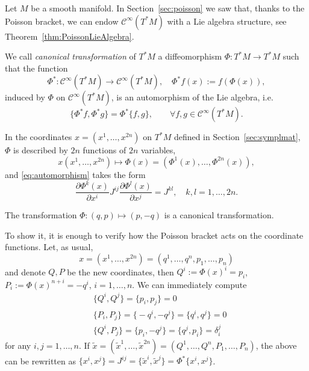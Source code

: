 \documentclass[english,fontsize=11pt,paper=a5,oneside]{scrbook}
\newcommand{\cC}{\mathcal{C}}
\theoremstyle{definition}
\newenvironment{example}
  {\pushQED{\qed}\renewcommand{\qedsymbol}{$\lozenge$}\examplex}
  {\popQED\endexamplex}
\begin{document}
Let $M$ be a smooth manifold. In Section~\ref{sec:poisson} we saw that, thanks to the Poisson bracket, we can endow $\cC^\infty(T^*M)$ with a Lie algebra structure, see Theorem~\ref{thm:PoissonLieAlgebra}.

\begin{tcolorbox}
    We call \emph{canonical transformation} of $T^*M$ a diffeomorphism $\Phi: T^*M\to T^*M$ such that the function
    \begin{equation}
        \Phi^*: \cC^\infty(T^*M) \to \cC^\infty(T^*M),\quad
        \Phi^* f(x) := f(\Phi(x)),
    \end{equation}
    induced by $\Phi$ on $\cC^\infty(T^*M)$, is an automorphism of the Lie algebra, i.e.
    \begin{equation}\label{eq:automorphism}
        \big\{\Phi^* f, \Phi^* g\big\} = \Phi^*\big\{f,g\big\}, \qquad\forall f,g\in\cC^\infty(T^*M).
    \end{equation}
\end{tcolorbox}

In the coordinates $x=(x^1, \ldots, x^{2n})$ on $T^*M$ defined in Section~\ref{sec:symplmat}, $\Phi$ is described by $2n$ functions of $2n$ variables,
\begin{equation}
    x(x^1,\ldots,x^{2n}) \mapsto \Phi(x) = \left(\Phi^1(x), \ldots, \Phi^{2n}(x)\right),
\end{equation}
and \eqref{eq:automorphism} takes the form
\begin{equation}\label{eq:cantrafocoord}
    \frac{\partial\Phi^k(x)}{\partial x^i} J^{ij} \frac{\partial\Phi^l(x)}{\partial x^j} = J^{kl},\quad k,l=1,\ldots,2n.
\end{equation}

\begin{example}
    The transformation $\Phi: (q,p) \mapsto (p, -q)$ is a canonical transformation.

    To show it, it is enough to verify how the Poisson bracket acts on the coordinate functions. Let, as usual, \begin{equation}
        x=(x^1, \ldots,x^{2n})=(q^1,\ldots,q^n,p_1,\ldots,p_n)
    \end{equation}
    and denote $Q,P$ be the new coordinates, then $Q^i := \Phi(x)^i = p_i$, $P_i := \Phi(x)^{n+i} = -q^i$, $i=1,\ldots, n$.
    We can immediately compute
    \begin{align}
        &\big\{Q^i, Q^j\big\} = \big\{p_i, p_j\big\} = 0\\
        &\big\{P_i, P_j\big\} = \big\{-q^i, -q^j\big\} = \big\{q^i, q^j\big\} = 0\\
        &\big\{Q^i, P_j\big\} = \big\{p_i, -q^j\big\} = \big\{q^j, p_i\big\} = \delta^j_i
    \end{align}
    for any $i,j=1,\ldots,n$.
    If $\tilde x = (\tilde x^1, \ldots, \tilde x^{2n})= (Q^1, \ldots, Q^n, P_1,\ldots,P_n)$, the above can be rewritten as $\big\{x^i, x^j\big\} = J^{ij} = \big\{\tilde x^i, \tilde x^j\big\} = \Phi^* \big\{x^i, x^j\big\}$.
\end{example}
\end{document}
